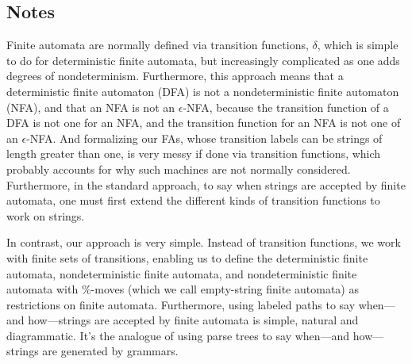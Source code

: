 %

\subsection{Notes}

Finite automata are normally defined via transition functions,
$\delta$, which is simple to do for deterministic finite automata,
but increasingly complicated as one adds degrees of nondeterminism.
Furthermore, this approach means that a deterministic finite automaton
(DFA) is not a nondeterministic finite automaton (NFA), and that an
NFA is not an $\epsilon$-NFA, because the transition function of a DFA
is not one for an NFA, and the transition function for an NFA is not
one of an $\epsilon$-NFA.  And formalizing our FAs, whose transition
labels can be strings of length greater than one, is very messy if
done via transition functions, which probably accounts for why such
machines are not normally considered.  Furthermore, in the standard
approach, to say when strings are accepted by finite automata, one must
first extend the different kinds of transition functions to work on
strings.

In contrast, our approach is very simple.  Instead of transition
functions, we work with finite sets of transitions, enabling us to
define the deterministic finite automata, nondeterministic finite
automata, and nondeterministic finite automata with $\%$-moves (which
we call empty-string finite automata) as restrictions on finite
automata.  Furthermore, using labeled paths to say when---and
how---strings are accepted by finite automata is simple, natural and
diagrammatic.  It's the analogue of using parse trees to say
when---and how---strings are generated by grammars.


